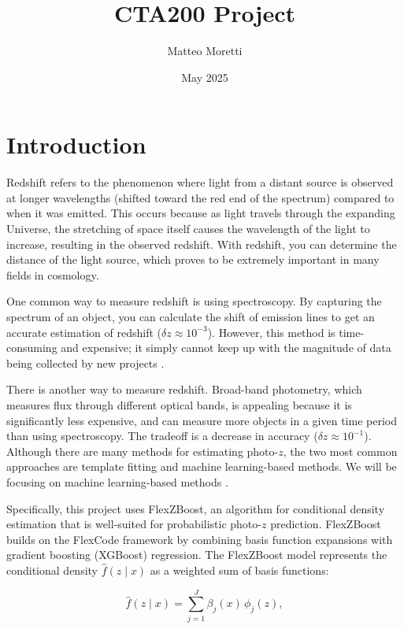\documentclass{article}
\title{CTA200 Project}
\author{Matteo Moretti}
\date{May 2025}
\begin{document}
\maketitle

\newpage

\section*{Introduction}

Redshift refers to the phenomenon where light from a distant source is observed at longer wavelengths (shifted toward the red end of the spectrum) compared to when it was emitted. This occurs because as light travels through the expanding Universe, the stretching of space itself causes the wavelength of the light to increase, resulting in the observed redshift. With redshift, you can determine the distance of the light source, which proves to be extremely important in many fields in cosmology.

One common way to measure redshift is using spectroscopy. By capturing the spectrum of an object, you can calculate the shift of emission lines to get an accurate estimation of redshift ($\delta z \approx 10^{-3}$). However, this method is time-consuming and expensive; it simply cannot keep up with the magnitude of data being collected by new projects \cite{schmidt2021flexzboost}.

There is another way to measure redshift. Broad-band photometry, which measures flux through different optical bands, is appealing because it is significantly less expensive, and can measure more objects in a given time period than using spectroscopy. The tradeoff is a decrease in accuracy ($\delta z \approx 10^{-1}$). Although there are many methods for estimating photo-$z$, the two most common approaches are template fitting and machine learning-based methods. We will be focusing on machine learning-based methods \cite{izbicki2020photometric}.

Specifically, this project uses FlexZBoost, an algorithm for conditional density estimation that is well-suited for probabilistic photo-\(z\) prediction. FlexZBoost builds on the FlexCode framework by combining basis function expansions with gradient boosting (XGBoost) regression. The FlexZBoost model represents the conditional density \( \hat{f}(z \mid x) \) as a weighted sum of basis functions:

\begin{equation}
\hat{f}(z \mid x) = \sum_{j=1}^{J} \beta_j(x)\, \phi_j(z),
\label{eq:flexcode}
\end{equation}
\end{document}
